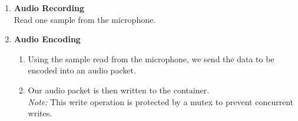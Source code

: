 \documentclass[a4paper]{article}
\begin{document}
\begin{enumerate}
\begin{enumerate}
\begin{enumerate}
			\end{enumerate}
		\item \textbf{Audio Recording}
			\\  Read one sample from the microphone.
		\item \textbf{Audio Encoding}
			\begin{enumerate}
				\item {} Using the sample read from the microphone, we send the data to be encoded into an audio packet. 
				\item {} Our audio packet is then written to the container.
						\\\textit{Note:} This write operation is protected by a mutex to prevent concurrent writes.
			\end{enumerate}
	\end{enumerate}


\end{enumerate}
\end{document}
